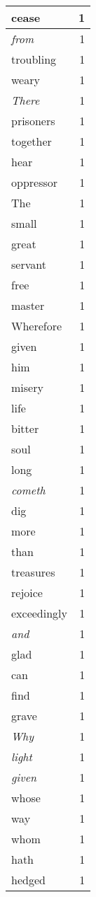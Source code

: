 \begin{center}
\begin{longtable}{l|r}
cease & 1\\ \hline 
\emph{from} & 1\\ \hline 
troubling & 1\\ \hline 
weary & 1\\ \hline 
\emph{There} & 1\\ \hline 
prisoners & 1\\ \hline 
together & 1\\ \hline 
hear & 1\\ \hline 
oppressor & 1\\ \hline 
The & 1\\ \hline 
small & 1\\ \hline 
great & 1\\ \hline 
servant & 1\\ \hline 
free & 1\\ \hline 
master & 1\\ \hline 
Wherefore & 1\\ \hline 
given & 1\\ \hline 
him & 1\\ \hline 
misery & 1\\ \hline 
life & 1\\ \hline 
bitter & 1\\ \hline 
soul & 1\\ \hline 
long & 1\\ \hline 
\emph{cometh} & 1\\ \hline 
dig & 1\\ \hline 
more & 1\\ \hline 
than & 1\\ \hline 
treasures & 1\\ \hline 
rejoice & 1\\ \hline 
exceedingly & 1\\ \hline 
\emph{and} & 1\\ \hline 
glad & 1\\ \hline 
can & 1\\ \hline 
find & 1\\ \hline 
grave & 1\\ \hline 
\emph{Why} & 1\\ \hline 
\emph{light} & 1\\ \hline 
\emph{given} & 1\\ \hline 
whose & 1\\ \hline 
way & 1\\ \hline 
whom & 1\\ \hline 
hath & 1\\ \hline 
hedged & 1\\ \hline 

\end{longtable}
\end{center}

